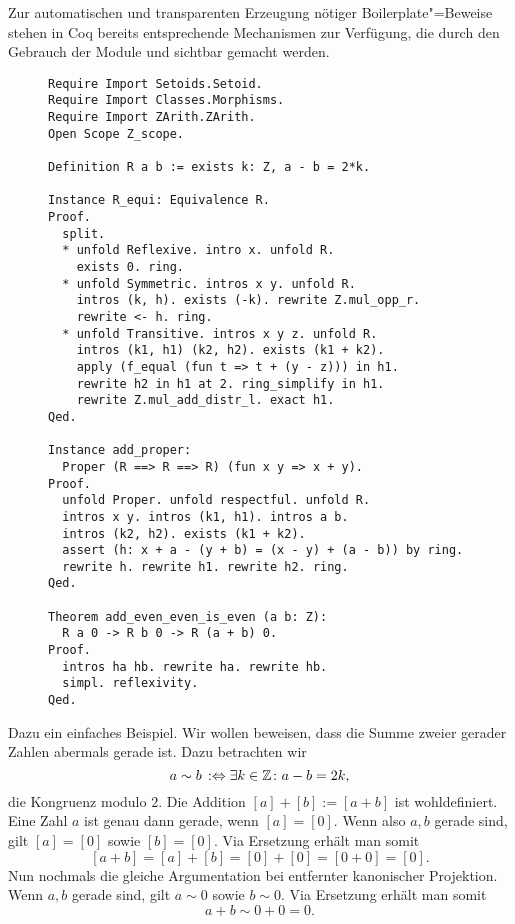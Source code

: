 Zur automatischen und transparenten Erzeugung nötiger Boilerplate"=Beweise
stehen in Coq bereits entsprechende Mechanismen zur Verfügung, die durch
den Gebrauch der Module  und  sichtbar
gemacht werden.

\begin{figure}
\begin{lstlisting}[language=Coq, xleftmargin=\mathindent, escapechar=`,
label=lst:Quotiententypen, caption={Setoid zum Restklassenring}]
Require Import Setoids.Setoid.
Require Import Classes.Morphisms.
Require Import ZArith.ZArith.
Open Scope Z_scope.

Definition R a b := exists k: Z, a - b = 2*k.

Instance R_equi: Equivalence R.
Proof.
  split.
  * unfold Reflexive. intro x. unfold R.
    exists 0. ring.
  * unfold Symmetric. intros x y. unfold R.
    intros (k, h). exists (-k). rewrite Z.mul_opp_r.
    rewrite <- h. ring.
  * unfold Transitive. intros x y z. unfold R.
    intros (k1, h1) (k2, h2). exists (k1 + k2).
    apply (f_equal (fun t => t + (y - z))) in h1.
    rewrite h2 in h1 at 2. ring_simplify in h1.
    rewrite Z.mul_add_distr_l. exact h1.
Qed.

Instance add_proper:
  Proper (R ==> R ==> R) (fun x y => x + y).
Proof.
  unfold Proper. unfold respectful. unfold R.
  intros x y. intros (k1, h1). intros a b.
  intros (k2, h2). exists (k1 + k2).
  assert (h: x + a - (y + b) = (x - y) + (a - b)) by ring.
  rewrite h. rewrite h1. rewrite h2. ring.
Qed.

Theorem add_even_even_is_even (a b: Z):
  R a 0 -> R b 0 -> R (a + b) 0.
Proof.
  intros ha hb. rewrite ha. rewrite hb.
  simpl. reflexivity.
Qed.
\end{lstlisting}
\end{figure}

Dazu ein einfaches Beispiel. Wir wollen beweisen, dass die Summe
zweier gerader Zahlen abermals gerade ist. Dazu betrachten wir
\[a\sim b\,:\Leftrightarrow \exists k\in\mathbb Z\colon a - b = 2k,\]
die Kongruenz modulo $2$. Die Addition $[a]+[b]:=[a+b]$ ist
wohldefiniert. Eine Zahl $a$ ist genau dann gerade, wenn $[a]=[0]$.
Wenn also $a,b$ gerade sind, gilt $[a]=[0]$ sowie $[b]=[0]$. Via
Ersetzung erhält man somit
\[[a+b] = [a]+[b] = [0]+[0] = [0+0] = [0].\]
Nun nochmals die gleiche Argumentation bei entfernter kanonischer
Projektion. Wenn $a,b$ gerade sind, gilt $a\sim 0$ sowie $b\sim 0$.
Via Ersetzung erhält man somit
\[a+b\sim 0+0 = 0.\]

